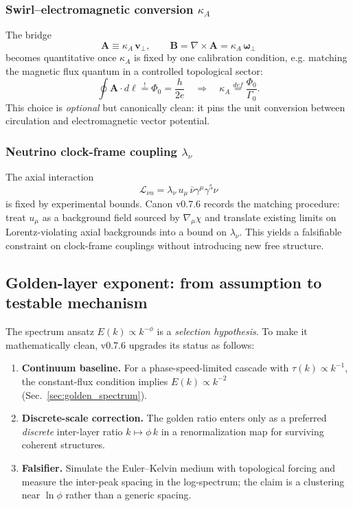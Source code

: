\documentclass[10pt]{article}
\begin{document}
\subsubsection{Swirl--electromagnetic conversion $\kappa_A$}
The bridge
\begin{equation}
\mathbf{A}\equiv \kappa_A\,\mathbf{v}_\perp,\qquad
\mathbf{B}=\nabla\times\mathbf{A}=\kappa_A\,\boldsymbol{\omega}_\perp
\end{equation}
becomes quantitative once $\kappa_A$ is fixed by one calibration condition, e.g.
matching the magnetic flux quantum in a controlled topological sector:
\begin{equation}
\oint \mathbf{A}\cdot d\boldsymbol{\ell} \stackrel{!}{=} \Phi_0=\frac{h}{2e}
\quad\Rightarrow\quad
\kappa_A \stackrel{def}{=}\frac{\Phi_0}{\Gamma_0}.
\end{equation}
This choice is \emph{optional} but canonically clean: it pins the unit
conversion between circulation and electromagnetic vector potential.

\subsubsection{Neutrino clock-frame coupling $\lambda_\nu$}
The axial interaction
\begin{equation}
\mathcal{L}_{\nu u}=\lambda_\nu\,u_\mu\,\bar{\nu}\gamma^\mu\gamma^5\nu
\end{equation}
is fixed by experimental bounds. Canon v0.7.6 records the matching procedure:
treat $u_\mu$ as a background field sourced by $\nabla_\mu\chi$ and translate existing
limits on Lorentz-violating axial backgrounds into a bound on $\lambda_\nu$.
This yields a falsifiable constraint on clock-frame couplings without introducing
new free structure.

\subsection{Golden-layer exponent: from assumption to testable mechanism}
\label{sec:phi_exponent_program}

The spectrum ansatz $E(k)\propto k^{-\phi}$ is a \emph{selection hypothesis}.
To make it mathematically clean, v0.7.6 upgrades its status as follows:

\begin{enumerate}
\item \textbf{Continuum baseline.} For a phase-speed-limited cascade with $\tau(k)\propto k^{-1}$,
the constant-flux condition implies $E(k)\propto k^{-2}$ (Sec.~\ref{sec:golden_spectrum}).
\item \textbf{Discrete-scale correction.} The golden ratio enters only as a preferred \emph{discrete}
inter-layer ratio $k\mapsto \phi\,k$ in a renormalization map for surviving coherent structures.
\item \textbf{Falsifier.} Simulate the Euler--Kelvin medium with topological forcing and measure the
inter-peak spacing in the log-spectrum; the claim is a clustering near $\ln\phi$ rather than a
generic spacing.
\end{enumerate}
\end{document}
